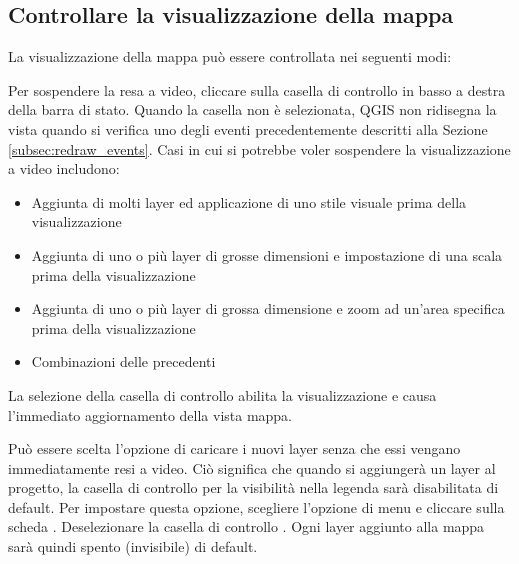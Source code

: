 \subsection{Controllare la visualizzazione della mappa}\label{label_controlmap}

La visualizzazione della mappa può essere controllata nei seguenti modi:

\label{label_suspendrender}

Per sospendere la resa a video, cliccare sulla casella di controllo
 in basso a destra della barra di stato. Quando la casella
 non è selezionata, QGIS non ridisegna la vista quando si
verifica uno degli eventi precedentemente descritti alla Sezione
\ref{subsec:redraw_events}. Casi in cui si potrebbe voler sospendere la
visualizzazione a video includono:

\begin{itemize}
\item Aggiunta di molti layer ed applicazione di uno stile visuale prima della visualizzazione
\item Aggiunta di uno o più layer di grosse dimensioni e impostazione di una scala prima della visualizzazione
\item Aggiunta di uno o più layer di grossa dimensione e zoom ad un'area specifica prima della visualizzazione
\item Combinazioni delle precedenti
\end{itemize}

La selezione della casella di controllo  abilita la visualizzazione e causa l'immediato aggiornamento della vista mappa.

\label{label_settinglayer}

Può essere scelta l'opzione di caricare i nuovi layer senza che essi vengano
immediatamente resi a video. Ciò significa che quando si aggiungerà un layer
al progetto, la casella di controllo per la visibilità nella legenda sarà
disabilitata di default. Per impostare questa opzione, scegliere l'opzione di
menu  \arrow {} e cliccare sulla
scheda . Deselezionare la casella di controllo . Ogni layer aggiunto alla mappa sarà quindi spento (invisibile) di default.

